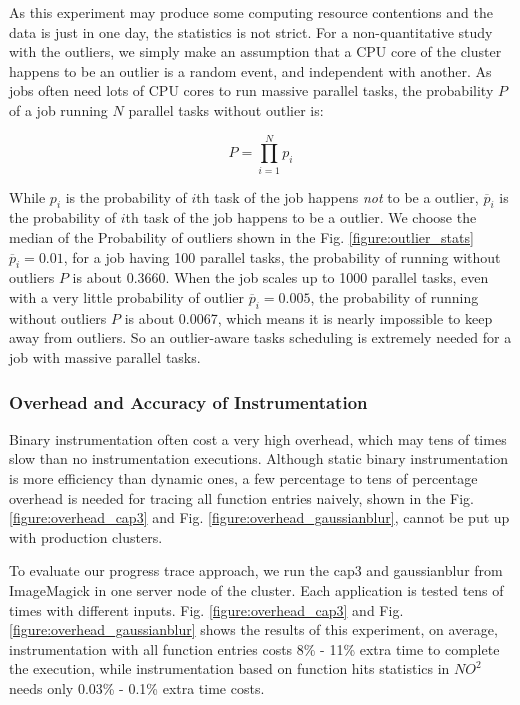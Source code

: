 As this experiment may produce some computing resource contentions and the data is just in one day, the statistics is not strict. For a non-quantitative study with the outliers, we simply make an assumption that a CPU core of the cluster happens to be an outlier is a random event, and independent with another. As jobs often need lots of CPU cores to run massive parallel tasks, the probability $P$ of a job running $N$ parallel tasks without outlier is:

$$P = \prod_{i=1}^N p_i$$

While $p_i$ is the probability of $i$th task of the job happens \emph{not} to be a outlier, $\overline{p}_i$ is the probability of $i$th task of the job happens to be a outlier. We choose the median of the Probability of outliers shown in the Fig. \ref{figure:outlier_stats} $\overline{p}_i = 0.01$, for a job having 100 parallel tasks, the probability of running without outliers $P$ is about 0.3660. When the job scales up to 1000 parallel tasks, even with a very little probability of outlier $\overline{p}_i = 0.005$, the probability of running without outliers $P$ is about 0.0067, which means it is nearly impossible to keep away from outliers. So an outlier-aware tasks scheduling is extremely needed for a job with massive parallel tasks.

\subsubsection{Overhead and Accuracy of Instrumentation}

Binary instrumentation often cost a very high overhead, which may tens of times slow than no instrumentation executions. Although static binary instrumentation is more efficiency than dynamic ones, a few percentage to tens of percentage overhead is needed for tracing all function entries naively, shown in the Fig. \ref{figure:overhead_cap3} and Fig. \ref{figure:overhead_gaussianblur}, cannot be put up with production clusters.

To evaluate our progress trace approach, we run the cap3 and gaussianblur from ImageMagick in one server node of the cluster. Each application is tested tens of times with different inputs. Fig. \ref{figure:overhead_cap3} and Fig. \ref{figure:overhead_gaussianblur} shows the results of this experiment, on average, instrumentation with all function entries costs 8\% - 11\% extra time to complete the execution, while instrumentation based on function hits statistics in $NO^2$ needs only 0.03\% - 0.1\% extra time costs.

